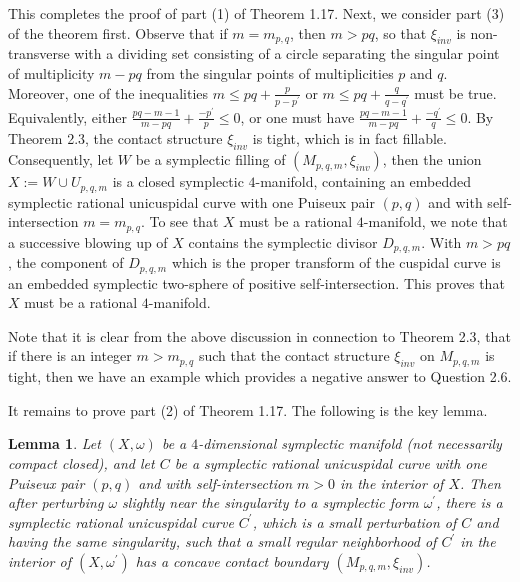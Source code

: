 \documentclass[11pt]{amsart}
\theoremstyle{plain}
\numberwithin{theorem}{section}
\newtheorem{lemma}[theorem]{Lemma}
\theoremstyle{definition}
\begin{document}
This completes the proof of part (1) of Theorem 1.17. Next, we consider part (3) of the theorem first. 
Observe that if $m=m_{p,q}$, then $m>pq$, so that $\xi_{inv}$ is non-transverse with a dividing set 
consisting of a circle separating the singular point of multiplicity $m-pq$ from the singular points of 
multiplicities $p$ and $q$. Moreover, one of the inequalities 
$m\leq pq+\frac{p}{p-p^\prime}$ or $m\leq pq+\frac{q}{q-q^\prime}$ must be true. Equivalently, either 
$\frac{pq-m-1}{m-pq}+\frac{-p^\prime}{p}\leq 0$, or one must have
$\frac{pq-m-1}{m-pq}+\frac{-q^\prime}{q}\leq 0$. By Theorem 2.3, the contact structure $\xi_{inv}$ is
tight, which is in fact fillable. Consequently, let $W$ be a symplectic filling of $(M_{p,q,m},\xi_{inv})$, then the union $X:=W\cup U_{p,q,m}$ is a closed symplectic 
$4$-manifold, containing an embedded symplectic rational unicuspidal curve with one Puiseux pair $(p,q)$ and 
with self-intersection $m=m_{p,q}$. To see that $X$ must be a rational $4$-manifold, we note that a successive 
blowing up of $X$ contains the symplectic divisor $D_{p,q,m}$. With $m>pq$, the component of $D_{p,q,m}$
which is the proper transform of the cuspidal curve is an embedded symplectic two-sphere of positive 
self-intersection. This proves that $X$ must be a rational $4$-manifold. 

Note that it is clear from the above discussion in connection to Theorem 2.3, that if there is an integer $m>m_{p,q}$ such that the contact structure $\xi_{inv}$ on $M_{p,q,m}$ is tight, then we have an example which provides a negative answer to Question 2.6.


It remains to prove part (2) of Theorem 1.17. The following is the key lemma.

\begin{lemma}
Let $(X,\omega)$ be a $4$-dimensional symplectic manifold (not necessarily compact closed), and let $C$ be a
symplectic rational unicuspidal curve with one Puiseux pair $(p,q)$ and with self-intersection $m>0$ in the interior of
$X$. Then after perturbing $\omega$ slightly near the singularity to a symplectic form $\omega^\prime$, there is a symplectic rational unicuspidal curve $C^\prime$, which is a small perturbation of $C$ and having the same singularity, such that a small regular neighborhood of $C^\prime$ in the interior of $(X,\omega^\prime)$ has a concave contact boundary $(M_{p,q,m},\xi_{inv})$.
\end{lemma}
\end{document}
